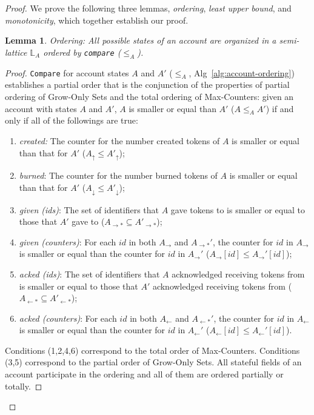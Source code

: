 \documentclass[9pt, oneside]{article}   	%
\newtheorem{lemma}{Lemma}
\begin{document}
\begin{proof}
We prove the following three lemmas, \textit{ordering}, \textit{least upper bound}, and \textit{monotonicity}, which together establish our proof.

\begin{lemma}
Ordering: All possible states of an account are organized in a semi-lattice $\mathds{L}_A$  ordered by \texttt{compare} ($\leq_A$).
\end{lemma}
\begin{proof}
 \texttt{Compare} for account states $A$ and $A'$ ($\leq_A$, Alg~\ref{alg:account-ordering}) establishes a partial order that is the conjunction of the properties of partial ordering of Grow-Only Sets and the total ordering of Max-Counters: given an account with states $A$ and $A'$, $A$ is smaller or equal than $A'$ ($A \leq_A A'$) if and only if all of the followings are true: 
 \begin{enumerate}
     \item \textit{created:} The counter for the number created tokens of $A$ is smaller or equal than that for $A'$ ($A_\uparrow \leq A'_\uparrow$);
     \item \textit{burned}: The counter for the number burned tokens of $A$ is smaller or equal than that for $A'$ ($A_\downarrow \leq A'_\downarrow$);
     \item \textit{given (ids)}: The set of identifiers that $A$ gave tokens to is smaller or equal to those that $A'$ gave to ($A_{\rightarrow *} \subseteq A'_{\rightarrow *}$); 
     \item \textit{given (counters)}: For each $id$ in both $A_{\rightarrow}$ and $A_{\rightarrow *}'$, the counter for $id$ in $A_{\rightarrow}$ is smaller or equal than the counter for $id$ in $A_{\rightarrow}'$ ($A_{\rightarrow}[id] \leq A_{\rightarrow}'[id]$);
      \item \textit{acked (ids)}: The set of identifiers that $A$ acknowledged receiving tokens from is smaller or equal to those that $A'$ acknowledged receiving tokens from ($A_{\leftarrow *} \subseteq A'_{\leftarrow *}$); 
     \item \textit{acked (counters)}: For each $id$ in both $A_{\leftarrow}$ and $A_{\leftarrow *}'$, the counter for $id$ in $A_{\leftarrow}$ is smaller or equal than the counter for $id$ in $A_{\leftarrow}'$ ($A_{\leftarrow}[id] \leq A_{\leftarrow}'[id]$).
 \end{enumerate}
 
 Conditions (1,2,4,6) correspond to the total order of Max-Counters. Conditions (3,5) correspond to the partial order of Grow-Only Sets. All stateful fields of an account participate in the ordering and all of them are ordered partially or totally.
 

\end{proof}
\end{proof}
\end{document}
